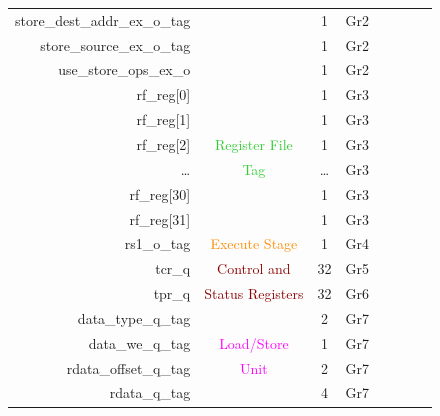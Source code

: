 \begin{table}[t]
\begin{tabular}{@{}rccccccc@{}}
        store\_dest\_addr\_ex\_o\_tag   &                                       & 1      & Gr2                         \\
        store\_source\_ex\_o\_tag       &                                       & 1      & Gr2                         \\
        use\_store\_ops\_ex\_o          &                                       & 1      & Gr2                         \\\hdashline
        rf\_reg[0]                      &                                       & 1      & Gr3                         \\
        rf\_reg[1]                      &                                       & 1      & Gr3                         \\
        rf\_reg[2]                      & \textcolor{LimeGreen}{Register File}  & 1      & Gr3                         \\
        \ldots                          & \textcolor{LimeGreen}{Tag}            & \ldots & Gr3                         \\
        rf\_reg[30]                     &                                       & 1      & Gr3                         \\
        rf\_reg[31]                     &                                       & 1      & Gr3                         \\\hdashline
        rs1\_o\_tag                     & \textcolor{DarkOrange}{Execute Stage} & 1      & Gr4                         \\\hdashline
        tcr\_q                          & \textcolor{DarkRed}{Control and}      & 32     & Gr5                         \\
        tpr\_q                          & \textcolor{DarkRed}{Status Registers} & 32     & Gr6                         \\\hdashline
        data\_type\_q\_tag              &                                       & 2      & Gr7                         \\
        data\_we\_q\_tag                & \textcolor{magenta}{Load/Store}       & 1      & Gr7                         \\
        rdata\_offset\_q\_tag           & \textcolor{magenta}{Unit}             & 2      & Gr7                         \\
        rdata\_q\_tag                   &                                       & 4      & Gr7                         \\
        \bottomrule
    \end{tabular}
\end{table}

